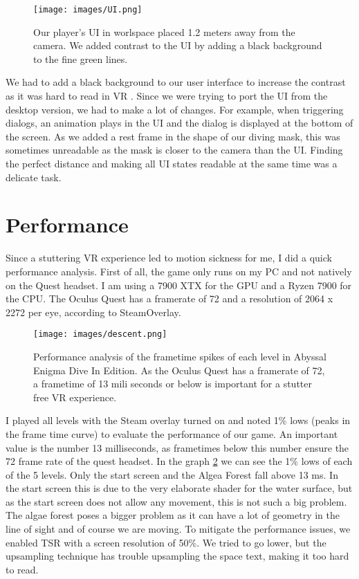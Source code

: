 \documentclass[letterpaper, 10 pt, conference]{ieeeconf}  %
\begin{document}
\begin{figure}[!ht]
    \caption{Our player's UI in worlspace placed 1.2 meters away from the camera. We added contrast to the UI by adding a black background to the fine green lines.}
    \centering
    \texttt{[image: images/UI.png]}
    \label{fig:UI}
\end{figure}

We had to add a black background to our user interface to increase the contrast as it was hard to read in VR \cite{dingler2018vr}.
Since we were trying to port the UI from the desktop version, we had to make a lot of changes.
For example, when triggering dialogs, an animation plays in the UI and the dialog is displayed at the bottom of the screen.
As we added a rest frame in the shape of our diving mask, this was sometimes unreadable as the mask is closer to the camera than the UI.
Finding the perfect distance and making all UI states readable at the same time was a delicate task.

\section{Performance}
\label{Sec:Performance}

Since a stuttering VR experience led to motion sickness for me, I did a quick performance analysis.
First of all, the game only runs on my PC and not natively on the Quest headset.
I am using a 7900 XTX for the GPU and a Ryzen 7900 for the CPU.
The Oculus Quest has a framerate of 72 and a resolution of 2064 x 2272 per eye, according to SteamOverlay. 

\begin{figure}[!ht]
    \caption{Performance analysis of the frametime spikes of each level in Abyssal Enigma Dive In Edition. 
    As the Oculus Quest has a framerate of 72, a frametime of 13 mili seconds or below is important for a stutter free VR experience.}
    \centering
    \texttt{[image: images/descent.png]}
    \label{fig:descent}
\end{figure}

I played all levels with the Steam overlay turned on and noted 1\% lows (peaks in the frame time curve) to evaluate the performance of our game.
An important value is the number 13 milliseconds, as frametimes below this number ensure the 72 frame rate of the quest headset. 
In the graph \ref{fig:descent} we can see the 1\% lows of each of the 5 levels.
Only the start screen and the Algea Forest fall above 13 ms.
In the start screen this is due to the very elaborate shader for the water surface, but as the start screen does not allow any movement, this is not such a big problem.
The algae forest poses a bigger problem as it can have a lot of geometry in the line of sight and of course we are moving.
To mitigate the performance issues, we enabled TSR with a screen resolution of 50\%.
We tried to go lower, but the upsampling technique has trouble upsampling the space text, making it too hard to read.
\end{document}
